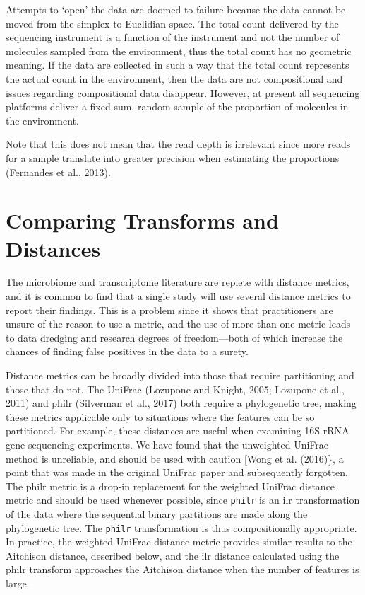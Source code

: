 \documentclass[twocolumn]{article}
\begin{document}
Attempts to `open' the data are doomed to failure because the data
cannot be moved from the simplex to Euclidian space. The total count
delivered by the sequencing instrument is a function of the instrument
and not the number of molecules sampled from the environment, thus the
total count has no geometric meaning. If the data are collected in such
a way that the total count represents the actual count in the
environment, then the data are not compositional and issues regarding
compositional data disappear. However, at present all sequencing
platforms deliver a fixed-sum, random sample of the proportion of
molecules in the environment.

Note that this does not mean that the read depth is irrelevant since
more reads for a sample translate into greater precision when estimating
the proportions (Fernandes et al., 2013).

\section{Comparing Transforms and Distances}

The microbiome and transcriptome literature are replete with distance
metrics, and it is common to find that a single study will use several
distance metrics to report their findings. This is a problem since it
shows that practitioners are unsure of the reason to use a metric, and
the use of more than one metric leads to data dredging and research
degrees of freedom---both of which increase the chances of finding false
positives in the data to a surety.

Distance metrics can be broadly divided into those that require
partitioning and those that do not. The UniFrac (Lozupone and Knight,
2005; Lozupone et al., 2011) and philr (Silverman et al., 2017) both
require a phylogenetic tree, making these metrics applicable only to
situations where the features can be so partitioned. For example, these
distances are useful when examining 16S rRNA gene sequencing
experiments. We have found that the unweighted UniFrac method is
unreliable, and should be used with caution {[}Wong et al. (2016)\}, a
point that was made in the original UniFrac paper and subsequently
forgotten. The philr metric is a drop-in replacement for the weighted
UniFrac distance metric and should be used whenever possible, since
\texttt{philr} is an ilr transformation of the data where the sequential
binary partitions are made along the phylogenetic tree. The
\texttt{philr} transformation is thus compositionally appropriate. In
practice, the weighted UniFrac distance metric provides similar results
to the Aitchison distance, described below, and the ilr distance
calculated using the philr transform approaches the Aitchison distance
when the number of features is large.
\end{document}

